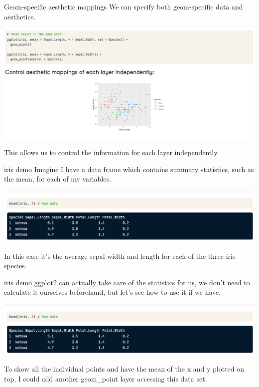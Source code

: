 \documentclass[
  ignorenonframetext,
]{beamer}
\begin{document}
\begin{frame}{Geom-specific aesthetic mappings}
\label{geom-specific-aesthetic-mappings}
We can specify both geom-specific data and aesthetics.

\includegraphics{../images/im187.png}

This allows us to control the information for each layer independently.
\end{frame}

\begin{frame}{iris demo}
\label{iris-demo}
Imagine I have a data frame which contains summary statistics, such as
the mean, for each of my variables.

\includegraphics{../images/im188.png}

In this case it's the average sepal width and length for each of the
three iris species.
\end{frame}

\begin{frame}{iris demo}
\label{iris-demo-1}
ggplot2 can actually take care of the statistics for us, we don't need
to calculate it ourselves beforehand, but let's see how to use it if we
have.

\includegraphics{../images/im188.png}

To show all the individual points and have the mean of the x and y
plotted on top, I could add another geom\_point layer accessing this
data set.
\end{frame}
\end{document}

